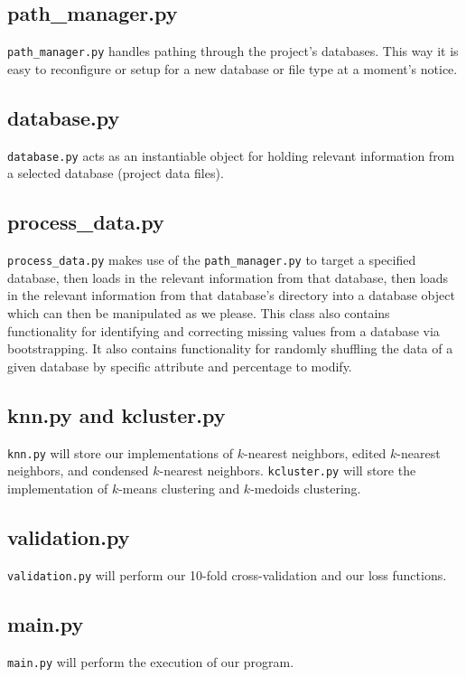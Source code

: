 \documentclass{article}
\begin{document}
\subsection*{path\_manager.py}
\texttt{path\_manager.py} handles pathing through the project's databases. This way it is easy to reconfigure or setup for a new database or file type at a moment's notice.

\subsection*{database.py}
\texttt{database.py} acts as an instantiable object for holding relevant information from a selected database (project data files).

\subsection*{process\_data.py}
\texttt{process\_data.py} makes use of the \texttt{path\_manager.py} to target a specified database, then loads in the relevant information from that database, then loads in the relevant information from that database's directory into a database object which can then be manipulated as we please. This class also contains functionality for identifying and correcting missing values from a database via bootstrapping. It also contains functionality for randomly shuffling the data of a given database by specific attribute and percentage to modify.

\subsection*{knn.py and kcluster.py}
\texttt{knn.py} will store our implementations of $k$-nearest neighbors, edited $k$-nearest neighbors, and condensed $k$-nearest neighbors. \texttt{kcluster.py} will store the implementation of $k$-means clustering and $k$-medoids clustering.

\subsection*{validation.py}
\texttt{validation.py} will perform our 10-fold cross-validation and our loss functions.

\subsection*{main.py}
\texttt{main.py} will perform the execution of our program. 
\end{document}
